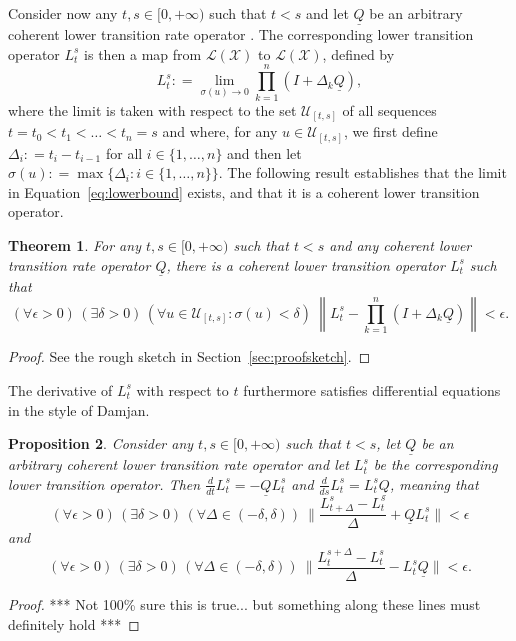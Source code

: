 \documentclass[a4paper,reqno]{amsart}
\newtheorem{theorem}{Theorem}
\newtheorem{proposition}[theorem]{Proposition}
\newcommand{\states}{\mathcal{X}}
\newcommand{\lbound}{L}
\newcommand{\gambles}{\mathcal{L}}
\newcommand{\gamblesX}{\gambles(\states)}
\newcommand{\lrate}{\underline{Q}}
\newcommand{\norm}[1]{\left\lVert #1 \right\rVert}
\newcommand{\coloneqq}{:\!=}
\begin{document}
Consider now any $t,s\in[0,+\infty)$ such that $t<s$ and let $\lrate$ be an arbitrary coherent lower transition rate operator . The corresponding lower transition operator $\lbound_t^s$ is then a map from $\gamblesX$ to $\gamblesX$, defined by
\begin{equation}\label{eq:lowerbound}
\lbound_t^s\coloneqq\lim_{\sigma(u)\to0}\prod_{k=1}^n(I+\Delta_k\lrate),
\end{equation}
where the limit is taken with respect to the set $\mathcal{U}_{[t,s]}$ of all sequences $t=t_0<t_1<\dots<t_n=s$ and where, for any $u\in\mathcal{U}_{[t,s]}$, we first define $\Delta_i\coloneqq t_i-t_{i-1}$ for all $i\in\{1,\dots,n\}$ and then let $\sigma(u)\coloneqq\max\{\Delta_i\colon i\in\{1,\dots,n\}\}$. The following result establishes that the limit in Equation~\eqref{eq:lowerbound} exists, and that it is a coherent lower transition operator.

\begin{theorem}\label{theo:convergencelowerbound}
For any $t,s\in[0,+\infty)$ such that $t<s$ and any coherent lower transition rate operator $\lrate$, there is a coherent lower transition operator $\lbound_t^s$ such that 
\begin{equation*}
(\forall\epsilon>0)\,
(\exists\delta>0)\,
(\forall u\in\mathcal{U}_{[t,s]}\colon\sigma(u)<\delta)~\norm{\lbound_t^s - \prod_{k=1}^n(I+\Delta_k\lrate)}<\epsilon.
\end{equation*}
\end{theorem}
\begin{proof}
See the rough sketch in Section~\ref{sec:proofsketch}.
\end{proof}

The derivative of $\lbound_t^s$ with respect to $t$ furthermore satisfies differential equations in the style of Damjan.

\begin{proposition}
Consider any $t,s\in[0,+\infty)$ such that $t<s$, let $\lrate$ be an arbitrary coherent lower transition rate operator and let $\lbound_t^s$ be the corresponding lower transition operator. Then $\frac{d}{dt}\lbound_t^s=-\lrate\lbound_t^s$ and $\frac{d}{ds}\lbound_t^s=\lbound_t^s\lrate$, meaning that
\begin{equation*}
(\forall\epsilon>0)\,
(\exists\delta>0)\,
(\forall\Delta\in(-\delta,\delta))~
\Big\lVert\frac{L_{t+\Delta}^s-L_t^s}{\Delta}+\lrate L_t^s\Big\rVert<\epsilon
\end{equation*}
and
\begin{equation*}
(\forall\epsilon>0)\,
(\exists\delta>0)\,
(\forall\Delta\in(-\delta,\delta))~
\Big\lVert\frac{L_{t}^{s+\Delta}-L_t^s}{\Delta}-\lbound_t^s\lrate \Big\rVert<\epsilon.
\end{equation*}
\end{proposition}
\begin{proof}
*** Not 100\% sure this is true... but something along these lines must definitely hold ***
\end{proof}
\end{document}
